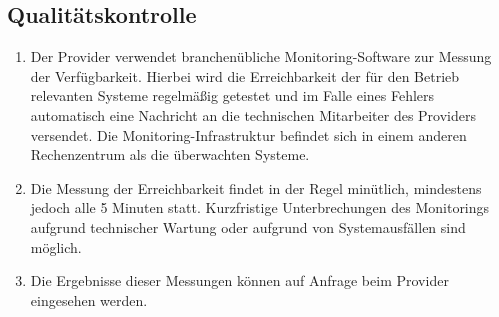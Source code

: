 \documentclass{terms}
\begin{document}
\subsection{Qualitätskontrolle}
\begin{enumerate}
\item Der Provider verwendet branchenübliche Monitoring-Software zur Messung der Verfügbarkeit.
      Hierbei wird die Erreichbarkeit der für den Betrieb relevanten Systeme regelmäßig getestet und im Falle eines Fehlers automatisch eine Nachricht an die technischen Mitarbeiter des Providers versendet.
      Die Monitoring-Infrastruktur befindet sich in einem anderen Rechenzentrum als die überwachten Systeme.
\item Die Messung der Erreichbarkeit findet in der Regel minütlich, mindestens jedoch alle 5 Minuten statt.
      Kurzfristige Unterbrechungen des Monitorings aufgrund technischer Wartung oder aufgrund von Systemausfällen sind möglich.
\item Die Ergebnisse dieser Messungen können auf Anfrage beim Provider eingesehen werden.
\end{enumerate}
\end{document}
